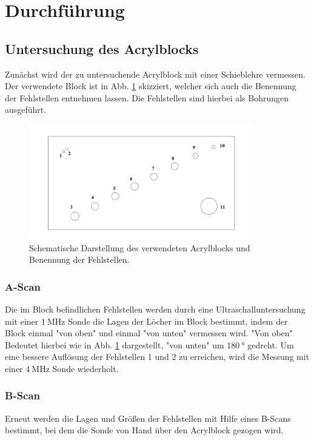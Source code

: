\section{Durchführung}
\label{sec:Durchführung}
\subsection{Untersuchung des Acrylblocks}
Zunächst wird der zu untersuchende Acrylblock mit einer Schieblehre vermessen. Der verwendete Block ist in Abb. \ref{fig:Block} skizziert, welcher sich auch die Benennung der Fehlstellen entnehmen lassen. Die Fehlstellen sind hierbei als Bohrungen ausgeführt.

\begin{figure}
  \centering
  \includegraphics[height = 5cm]{./Block.PNG}
  \caption{Schematische Darstellung des verwendeten Acrylblocks und Benennung der Fehlstellen. \cite{Anleitung}}
  \label{fig:Block}
\end{figure}

\subsubsection{A-Scan}
Die im Block befindlichen Fehlstellen werden durch eine Ultraschalluntersuchung mit einer $\SI{1}{\mega\hertz}$ Sonde die Lagen der Löcher im Block bestimmt, indem der Block einmal "von oben" und einmal "von unten" vermessen wird. "Von oben" Bedeutet hierbei wie in Abb. \ref{fig:Block} dargestellt, "von unten" um $\SI{180}{\degree}$ gedreht.
Um eine bessere Auflösung der Fehlstellen 1 und 2 zu erreichen, wird die Messung mit einer $\SI{4}{\mega\hertz}$ Sonde wiederholt.

\subsubsection{B-Scan}
Erneut werden die Lagen und Größen der Fehlstellen mit Hilfe eines B-Scans bestimmt, bei dem die Sonde von Hand über den Acrylblock gezogen wird.

